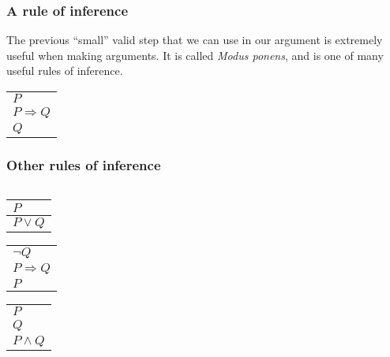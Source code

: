 \begin{frame}\frametitle{A rule of inference}
  The previous ``small'' valid step that we can use in our argument is
  extremely useful when making arguments.  It is called {\em Modus
    ponens}, and is one of many useful rules of inference.

  \begin{tcolorbox}[title=Modus ponens]
    \begin{tabular}{l}
      $P$\\
      $P\Rightarrow Q$\\
      \hline
      $Q$
    \end{tabular}
  \end{tcolorbox}
  
\end{frame}

\begin{frame}\frametitle{Other rules of inference}
  \begin{columns}
    
    \begin{column}{0.4\textwidth}

      \begin{tcolorbox}[title=Addition]
        \begin{tabular}{l}
          $P$\\
          \hline
          $P\vee Q$
        \end{tabular}
      \end{tcolorbox}
      
      \begin{tcolorbox}[title=Modus tollens]
        \begin{tabular}{l}
          $\neg Q$\\
          $P\Rightarrow Q$\\
          \hline
          $P$
        \end{tabular}
      \end{tcolorbox}
      
      \begin{tcolorbox}[title=Conjuction]
        \begin{tabular}{l}
          $P$\\
          $Q$\\
          \hline
          $P\wedge Q$
        \end{tabular}
      \end{tcolorbox}
      
    \end{column}
    

\end{columns}
\end{frame}
